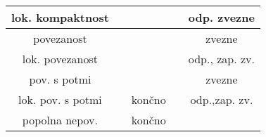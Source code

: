 \documentclass[10pt,a4paper]{article}
\newcommand{\cmark}{\checkmark}%
\newcommand{\xmark}{\ding{55}}%
\begin{document}
\begin{table}
\begin{tabular}{|c|c|c|c|c|}
        lok. kompaktnost  &       & \cmark& \xmark& odp. zvezne   \\ \hline
        povezanost        &       & \cmark& \cmark& zvezne        \\ \hline
        lok. povezanost   &       & \cmark& \cmark& odp., zap. zv.\\ \hline
        pov. s potmi      &       & \cmark& \cmark& zvezne        \\ \hline
        lok. pov. s potmi &       & končno& \cmark& odp.,zap. zv. \\ \hline
        popolna nepov.    &       & končno& \xmark&               \\ \hline
    \end{tabular}
\end{table}

\begin{table}[htbp]
    \begin{tabular}{|c|c|}
    \hline


\end{tabular}
\end{table}
\end{document}
